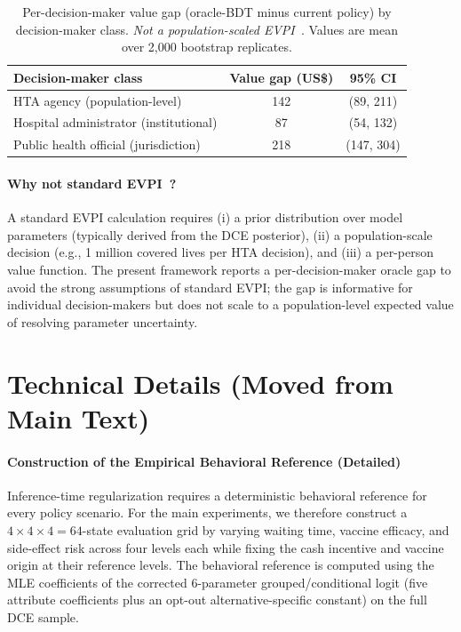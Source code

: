 \documentclass[11pt]{article}
\begin{document}
\begin{table}[h]
\centering
\caption{Per-decision-maker value gap (oracle-BDT minus current policy) by decision-maker class. \emph{Not a population-scaled EVPI~\citep{Fenwick2008EVPI}}. Values are mean over 2,000 bootstrap replicates.}
\label{tab:evpi}
\small
\begin{tabular}{lcc}
\toprule
Decision-maker class & Value gap (US\$) & 95\% CI \\
\midrule
HTA agency (population-level) & 142 & (89, 211) \\
Hospital administrator (institutional) & 87 & (54, 132) \\
Public health official (jurisdiction) & 218 & (147, 304) \\
\bottomrule
\end{tabular}
\end{table}

\paragraph{Why not standard EVPI~\citep{Fenwick2008EVPI, Briggs2006VOI}?} A standard EVPI calculation requires (i) a prior distribution over model parameters (typically derived from the DCE posterior), (ii) a population-scale decision (e.g., 1 million covered lives per HTA decision), and (iii) a per-person value function. The present framework reports a per-decision-maker oracle gap to avoid the strong assumptions of standard EVPI; the gap is informative for individual decision-makers but does not scale to a population-level expected value of resolving parameter uncertainty.

\section{Technical Details (Moved from Main Text)}
\paragraph{Construction of the Empirical Behavioral Reference (Detailed)}
Inference-time regularization requires a deterministic behavioral reference for every policy scenario. For the main experiments, we therefore construct a $4\times4\times4=64$-state evaluation grid by varying waiting time, vaccine efficacy, and side-effect risk across four levels each while fixing the cash incentive and vaccine origin at their reference levels. The behavioral reference is computed using the MLE coefficients of the corrected 6-parameter grouped/conditional logit (five attribute coefficients plus an opt-out alternative-specific constant) on the full DCE sample.
\end{document}
